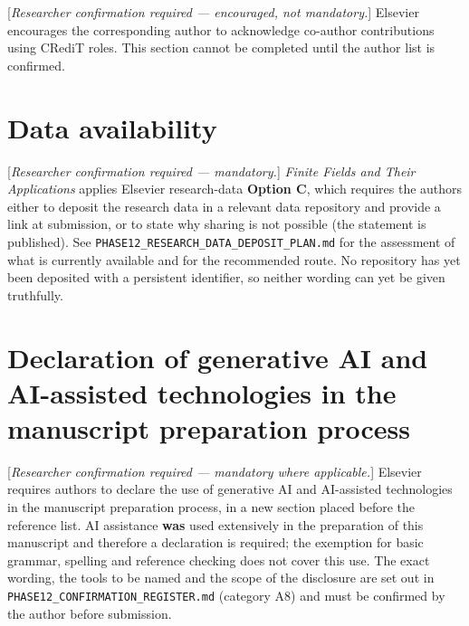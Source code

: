 \documentclass[11pt,a4paper]{article}
\theoremstyle{plain}
\theoremstyle{definition}
\theoremstyle{remark}
\begin{document}
[\emph{Researcher confirmation required --- encouraged, not mandatory.}] Elsevier
encourages the corresponding author to acknowledge co-author contributions
using CRediT roles. This section cannot be completed until the author list is
confirmed.

\section*{Data availability}
\label{sec:dataavailability}

[\emph{Researcher confirmation required --- mandatory.}] \emph{Finite Fields and Their
Applications} applies Elsevier research-data \textbf{Option C}, which requires
the authors either to deposit the research data in a relevant data repository
and provide a link at submission, or to state why sharing is not possible (the
statement is published). See \texttt{PHASE12\_RESEARCH\_DATA\_DEPOSIT\_PLAN.md} for the
assessment of what is currently available and for the recommended route. No
repository has yet been deposited with a persistent identifier, so neither
wording can yet be given truthfully.

\section*{Declaration of generative AI and AI-assisted technologies in the
manuscript preparation process}
\label{sec:genai}

[\emph{Researcher confirmation required --- mandatory where applicable.}] Elsevier
requires authors to declare the use of generative AI and AI-assisted
technologies in the manuscript preparation process, in a new section placed
before the reference list. AI assistance \textbf{was} used extensively in the
preparation of this manuscript and therefore a declaration is required; the
exemption for basic grammar, spelling and reference checking does not cover
this use. The exact wording, the tools to be named and the scope of the
disclosure are set out in
\texttt{PHASE12\_CONFIRMATION\_REGISTER.md} (category A8) and must be confirmed by
the author before submission.


\appendix





\end{document}
